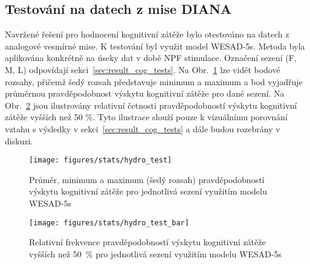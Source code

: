 
\subsection{Testování na datech z mise DIANA}
\label{subsec:ml_diana_data_test}
Navržené řešení pro hodnocení kognitivní zátěže bylo otestováno na datech z
analogové vesmírné mise. K testování byl využit model WESAD-5s. Metoda byla
aplikována konkrétně na úseky dat v době \gls{NPF} stimulace. Označení sezení
(F, M, L) odpovídají sekci~\ref{sec:result_cog_tests}. Na
Obr.~\ref{fig:hydro_test} lze vidět bodové rozsahy, přičemž šedý rozsah
představuje minimum a maximum a bod vyjadřuje průměrnou pravděpodobnost výskytu
kognitivní zátěže pro dané sezení. Na Obr.~\ref{fig:hydro_test_bar} jsou
ilustrovány relativní četnosti pravděpodobností výskytu kognitivní zátěže
vyšších než 50 \%. Tyto ilustrace slouží pouze k vizuálnímu porovnání vztahu s
výsledky v sekci~\ref{sec:result_cog_tests} a dále budou rozebrány v diskuzi.

\begin{figure}[!htb]
    \begin{center}
        \texttt{[image: figures/stats/hydro\_test]}
        \caption{Průměr, minimum a maximum (šedý rozsah) pravděpodobností
        výskytu kognitivní zátěže pro jednotlivá sezení využitím modelu
        WESAD-5s}
        \label{fig:hydro_test}
    \end{center}
\end{figure}

\begin{figure}[!htb]
    \begin{center}
        \texttt{[image: figures/stats/hydro\_test\_bar]}
        \caption{Relativní frekvence pravděpodobností výskytu kognitivní zátěže
        vyšších než 50~\% pro jednotlivá sezení využitím modelu WESAD-5s}
        \label{fig:hydro_test_bar}
    \end{center}
\end{figure}